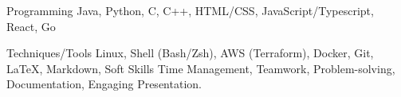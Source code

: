 

\begin{cvskills}

  \cvskill
    {Programming} %
    {
      Java,
      Python, 
      C,
      C++, 
      HTML/CSS, 
      JavaScript/Typescript,
      React,
      Go
    } %

  \cvskill
    {Techniques/Tools} %
    {
      Linux, 
      Shell (Bash/Zsh), 
      AWS (Terraform),
      Docker,
      Git,
      \LaTeX,
      Markdown, 
    } %
  \cvskill
    {Soft Skills} %
    {
      Time Management, 
      Teamwork, 
      Problem-solving, 
      Documentation, 
      Engaging Presentation.
    } %

\end{cvskills}
